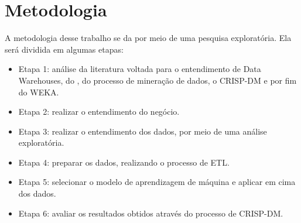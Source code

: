 \section{Metodologia}
A metodologia desse trabalho se da por meio de uma pesquisa exploratória. Ela será dividida em algumas etapas:

\begin{itemize}
    \item Etapa 1: análise da literatura voltada para o entendimento de Data Warehouses, do \pdi, do processo de mineração de dados, o CRISP-DM e por fim do WEKA.
    \item Etapa 2: realizar o entendimento do negócio.
    \item Etapa 3: realizar o entendimento dos dados, por meio de uma análise exploratória.
    \item Etapa 4: preparar os dados, realizando o processo de ETL.
    \item Etapa 5: selecionar o modelo de aprendizagem de máquina e aplicar em cima dos dados.
    \item Etapa 6: avaliar os resultados obtidos através do processo de CRISP-DM.
\end{itemize}